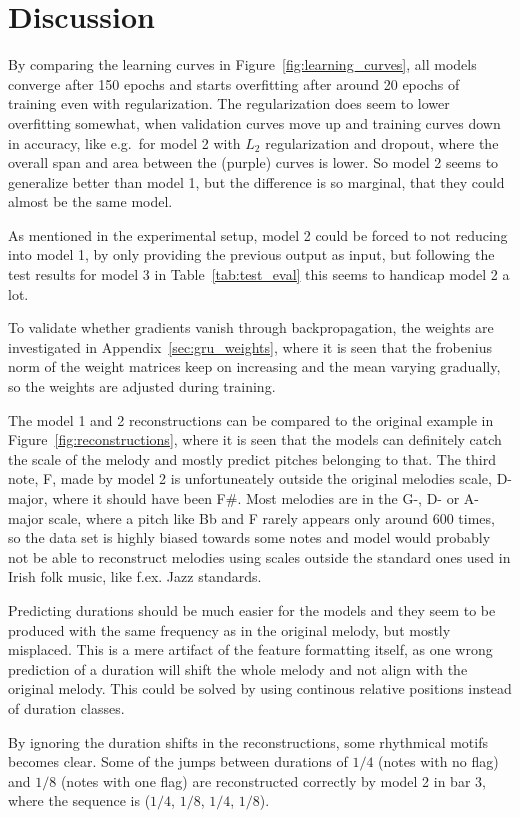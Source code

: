 \section{Discussion}
\label{sec:discussion}
By comparing the learning curves in Figure~\ref{fig:learning_curves}, all models converge after 150 epochs and starts overfitting after around 20 epochs of training even with regularization. The regularization does seem to lower overfitting somewhat, when validation curves move up and training curves down in accuracy, like e.g.\ for model 2 with $L_2$ regularization and dropout, where the overall span and area between the (purple) curves is lower. So model 2 seems to generalize better than model 1, but the difference is so marginal, that they could almost be the same model.

As mentioned in the experimental setup, model 2 could be forced to not reducing into model 1, by only providing the previous output as input, but following the test results for model 3 in Table~\ref{tab:test_eval} this seems to handicap model 2 a lot.  

To validate whether gradients vanish through backpropagation, the weights are investigated in Appendix~\ref{sec:gru_weights}, where it is seen that the frobenius norm of the weight matrices keep on increasing and the mean varying gradually, so the weights are adjusted during training. 

The model 1 and 2 reconstructions can be compared to the original example in Figure~\ref{fig:reconstructions}, where it is seen that the models can definitely catch the scale of the melody and mostly predict pitches belonging to that. The third note, F, made by model 2 is unfortuneately outside the original melodies scale, D-major, where it should have been F\#. Most melodies are in the G-, D- or A-major scale, where a pitch like Bb and F rarely appears only around 600 times, so the data set is highly biased towards some notes and model would probably not be able to reconstruct melodies using scales outside the standard ones used in Irish folk music, like f.ex. Jazz standards.   

Predicting durations should be much easier for the models and they seem to be produced with the same frequency as in the original melody, but mostly misplaced. This is a mere artifact of the feature formatting itself, as one wrong prediction of a duration will shift the whole melody and not align with the original melody. This could be solved by using continous relative positions instead of duration classes. 

By ignoring the duration shifts in the reconstructions, some rhythmical motifs becomes clear. Some of the jumps between durations of $1/4$ (notes with no flag) and $1/8$ (notes with one flag) are reconstructed correctly by model 2 in bar 3, where the sequence is ($1/4$, $1/8$, $1/4$, $1/8$). 
